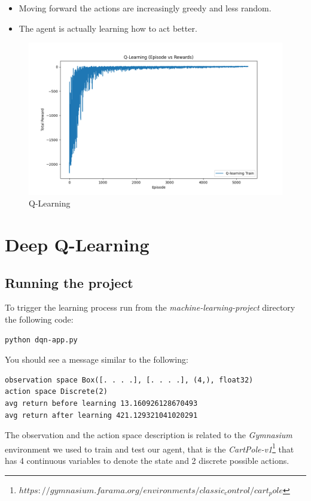 \documentclass{article}
\begin{document}
\begin{itemize}
  \item Moving forward the actions are increasingly greedy and less random.
  \item The agent is actually learning how to act better.
\end{itemize}

\begin{figure}
  \includegraphics[width=\linewidth]{qlearning.png}
  \caption{Q-Learning}
  \label{fig:qlearning}
\end{figure}

\section{Deep Q-Learning}

\subsection{Running the project}

To trigger the learning process run from the \emph{machine-learning-project} directory the following code:

\begin{verbatim}
python dqn-app.py
\end{verbatim}

You should see a message similar to the following:

\begin{verbatim}
observation space Box([. . . .], [. . . .], (4,), float32)
action space Discrete(2)  
avg return before learning 13.160926128670493
avg return after learning 421.129321041020291
\end{verbatim}

The observation and the action space description is related to the \emph{Gymnasium} environment we used to train and test our agent, 
that is the \emph{CartPole-v1}\footnote{$https://gymnasium.farama.org/environments/classic_control/cart_pole$} that has 4 
continuous variables to denote the state and 2 discrete possible actions.
\end{document}
